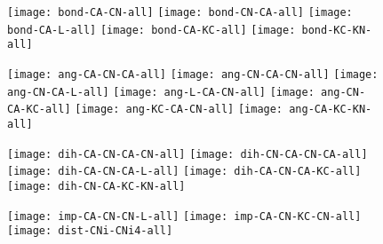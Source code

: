 \documentclass{article}
\begin{document}
\begin{figure}
  \begin{center}
    \begin{minipage}[t]{1.0\textwidth}
      \texttt{[image: bond-CA-CN-all]}
      \texttt{[image: bond-CN-CA-all]}
      \texttt{[image: bond-CA-L-all]}
      \texttt{[image: bond-CA-KC-all]}
      \texttt{[image: bond-KC-KN-all]}
    \end{minipage}
  \end{center}
\end{figure}

\begin{figure}
  \begin{center}
    \begin{minipage}[t]{1.0\textwidth}
      \texttt{[image: ang-CA-CN-CA-all]}
      \texttt{[image: ang-CN-CA-CN-all]}
      \texttt{[image: ang-CN-CA-L-all]}
      \texttt{[image: ang-L-CA-CN-all]}
      \texttt{[image: ang-CN-CA-KC-all]}
      \texttt{[image: ang-KC-CA-CN-all]}
      \texttt{[image: ang-CA-KC-KN-all]}
    \end{minipage}
  \end{center}
\end{figure}

\begin{figure}
  \begin{center}
    \begin{minipage}[t]{1.0\textwidth}
      \texttt{[image: dih-CA-CN-CA-CN-all]}
      \texttt{[image: dih-CN-CA-CN-CA-all]}
      \texttt{[image: dih-CA-CN-CA-L-all]}
      \texttt{[image: dih-CA-CN-CA-KC-all]}
      \texttt{[image: dih-CN-CA-KC-KN-all]}
    \end{minipage}
  \end{center}
\end{figure}

\begin{figure}
  \begin{center}
    \begin{minipage}[t]{1.0\textwidth}
      \texttt{[image: imp-CA-CN-CN-L-all]}
      \texttt{[image: imp-CA-CN-KC-CN-all]}
      \texttt{[image: dist-CNi-CNi4-all]}
    \end{minipage}
  \end{center}
\end{figure}
\end{document}
